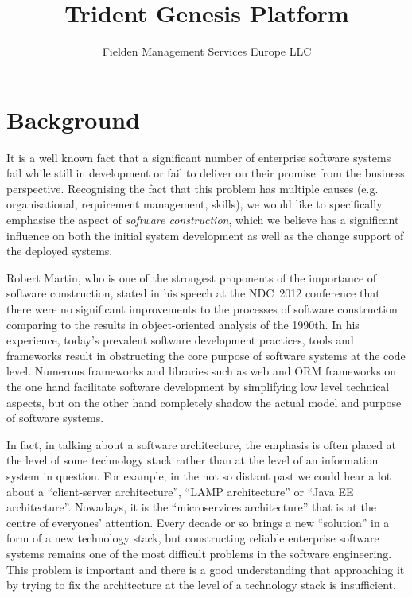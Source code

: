 \documentclass[a4paper,12pt,oneside,openright,final]{memoir} %
\title{Trident Genesis Platform}
\author{Fielden Management Services Europe LLC}
\date{}
\begin{document}
\maketitle
{}


\onehalfspacing


\section*{Background}

	It is a well known fact that a significant number of enterprise software systems fail while still in development or fail to deliver on their promise from the business perspective.  
  	Recognising the fact that this problem has multiple causes (e.g. organisational, requirement management, skills), we would like to specifically emphasise the aspect of \emph{software construction}, which we believe has a significant influence on both the initial system development as well as the change support of the deployed systems.  
  
  	Robert Martin, who is one of the strongest proponents of the importance of software construction, stated in his speech at the NDC~2012 conference that there were no significant improvements to the processes of software construction comparing to the results in object-oriented analysis of the 1990th. 
  	In his experience, today's prevalent software development practices, tools and frameworks result in obstructing the core purpose of software systems at the code level.
  	Numerous frameworks and libraries such as web and ORM frameworks on the one hand facilitate software development by simplifying low level technical aspects, but on the other hand completely shadow the actual model and purpose of software systems.  
  	
	In fact, in talking about a software architecture, the emphasis is often placed at the level of some technology stack rather than at the level of an information system in question.
	For example, in the not so distant past we could hear a lot about a ``client-server architecture'', ``LAMP architecture'' or ``Java EE architecture''.
	Nowadays, it is the ``microservices architecture'' that is at the centre of everyones' attention.
	Every decade or so brings a new ``solution'' in a form of a new technology stack, but constructing reliable enterprise software systems remains one of the most difficult problems in the software engineering.	
	This problem is important and there is a good understanding that approaching it by trying to fix the architecture at the level of a technology stack is insufficient.
\end{document}
